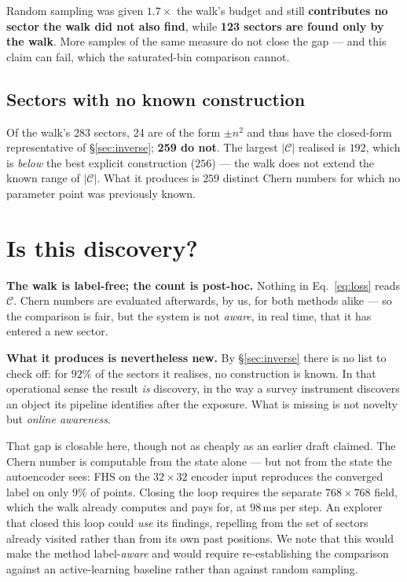 \documentclass[11pt]{article}
\newcommand{\good}[1]{\textcolor{blue!70!black}{\textbf{#1}}}
\begin{document}
Random sampling was given $1.7\times$ the walk's budget and still
\good{contributes no sector the walk did not also find}, while \good{123
sectors are found only by the walk}. More samples of the same measure do not
close the gap --- and this claim can fail, which the saturated-bin comparison
cannot.

\subsection{Sectors with no known construction}

Of the walk's 283 sectors, 24 are of the form $\pm n^2$ and thus have the
closed-form representative of \S\ref{sec:inverse}; \good{259 do not}. The
largest $|\mathcal{C}|$ realised is $192$, which is \emph{below} the best
explicit construction ($256$) --- the walk does not extend the known range of
$|\mathcal{C}|$. What it produces is $259$ distinct Chern numbers for which no
parameter point was previously known.

\section{Is this discovery?}

\textbf{The walk is label-free; the count is post-hoc.} Nothing in
Eq.~\eqref{eq:loss} reads $\mathcal{C}$. Chern numbers are evaluated afterwards,
by us, for both methods alike --- so the comparison is fair, but the system is
not \emph{aware}, in real time, that it has entered a new sector.

\textbf{What it produces is nevertheless new.} By \S\ref{sec:inverse} there is
no list to check off: for $92\%$ of the sectors it realises, no construction is
known. In that operational sense the result \emph{is} discovery, in the way a
survey instrument discovers an object its pipeline identifies after the
exposure. What is missing is not novelty but \emph{online awareness}.

That gap is closable here, though not as cheaply as an earlier draft claimed.
The Chern number is computable from the state alone --- but not from the state
the autoencoder sees: FHS on the $32\times32$ encoder input reproduces the
converged label on only $9\%$ of points. Closing the loop requires the separate
$768\times768$ field, which the walk already computes and pays for, at
$98$\,ms per step. An explorer that closed this loop could \emph{use} its
findings, repelling from the set of sectors already visited rather than from
its own past positions. We note that this would make the method
label-\emph{aware} and would require re-establishing the comparison against an
active-learning baseline rather than against random sampling.
\end{document}

